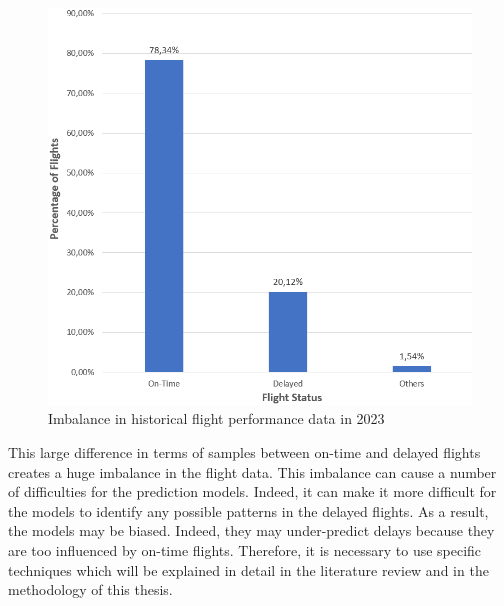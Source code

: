 \documentclass[12pt,oneside]{book} %
\begin{document}
\begin{figure}[H]
    \centering
    \includegraphics[width=0.8\linewidth]{Image/imbalance.png}
    \caption{Imbalance in historical flight performance data in 2023 \cite{BTS_flight_delays_statistics}}
    \label{fig:flights_imbalance}
\end{figure}

\noindent This large difference in terms of samples between on-time and delayed flights creates a huge imbalance in the flight data. This imbalance can cause a number of difficulties for the prediction models. Indeed, it can make it more difficult for the models to identify any possible patterns in the delayed flights. As a result, the models may be biased. Indeed, they may under-predict delays because they are too influenced by on-time flights. Therefore, it is necessary to use specific techniques which will be explained in detail in the literature review and in the methodology of this thesis.
\end{document}
